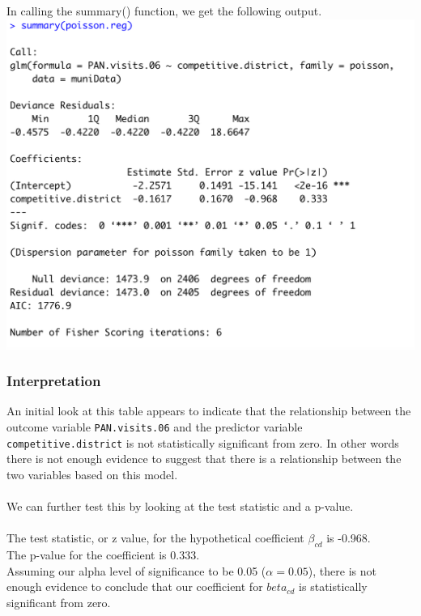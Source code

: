 \documentclass[12pt,letterpaper]{article}
\begin{document}
\noindent In calling the summary() function, we get the following output.
\\
\includegraphics[width=\linewidth]{poisson.model.1}
\\

\subsubsection{Interpretation}
\noindent 
An initial look at this table appears to indicate that the relationship between the outcome variable \texttt{PAN.visits.06} and the predictor variable \texttt{competitive.district} is not statistically significant from zero. In other words there is not enough evidence to suggest that there is a relationship between the two variables based on this model.
\\\\
\noindent We can further test this by looking at the test statistic and a p-value.
\\\\
\noindent
The test statistic, or z value, for the hypothetical coefficient $\beta_{cd}$ is -0.968.
\\

\noindent
The p-value for the coefficient is 0.333. 
\\

\noindent Assuming our alpha level of significance to be 0.05 ($\alpha = 0.05$), there is not enough evidence to conclude that our coefficient for \texttt{$beta_{cd}$} is statistically significant from zero.
\\
\end{document}

